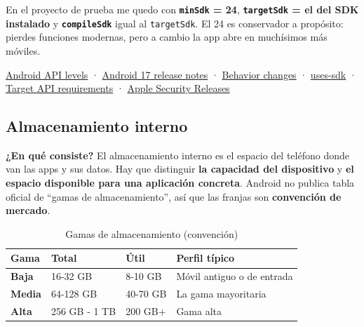 \documentclass[11pt,a4paper]{article}
\newcommand{\code}[1]{\texttt{\color{ink}#1}}
\newcommand{\campo}[1]{\textbf{\color{ink}#1}}
\begin{document}
	En el proyecto de prueba me quedo con \textbf{\code{minSdk} = 24}, \textbf{\code{targetSdk} = el del SDK instalado} y \textbf{\code{compileSdk}} igual al \code{targetSdk}. El 24 es conservador a propósito: pierdes funciones modernas, pero a cambio la app abre en muchísimos más móviles.
	
	\begin{fuentesbox}
		\href{https://developer.android.com/tools/releases/platforms}{Android API levels} ·
		\href{https://developer.android.com/about/versions/17/release-notes}{Android 17 release notes} ·
		\href{https://developer.android.com/about/versions/17/behavior-changes-all}{Behavior changes} ·
		\href{https://developer.android.com/guide/topics/manifest/uses-sdk-element}{uses-sdk} ·
		\href{https://support.google.com/googleplay/android-developer/answer/11926878}{Target API requirements} ·
		\href{https://support.apple.com/en-us/148282}{Apple Security Releases}
	\end{fuentesbox}
	
	\subsection{Almacenamiento interno}
	
	\campo{¿En qué consiste?}
	El almacenamiento interno es el espacio del teléfono donde van las apps y sus datos. Hay que distinguir \textbf{la capacidad del dispositivo} y \textbf{el espacio disponible para una aplicación concreta}. Android no publica tabla oficial de \enquote{gamas de almacenamiento}, así que las franjas son \textbf{convención de mercado}.
	
	\begin{table}[htbp]
		\centering
		\small
		\begin{tabularx}{\textwidth}{@{}l l l >{\RaggedRight\arraybackslash}X@{}}
			\toprule
			\rowcolor{primary}
			\textcolor{paper}{\sffamily\bfseries Gama} & \textcolor{paper}{\sffamily\bfseries Total} & \textcolor{paper}{\sffamily\bfseries Útil} & \textcolor{paper}{\sffamily\bfseries Perfil típico} \\
			\midrule
			\textbf{Baja} & 16-32 GB & 8-10 GB & Móvil antiguo o de entrada \\
			\rowcolor{soft}
			\textbf{Media} & 64-128 GB & 40-70 GB & La gama mayoritaria \\
			\textbf{Alta} & 256 GB - 1 TB & 200 GB+ & Gama alta \\
			\bottomrule
		\end{tabularx}
		\caption{Gamas de almacenamiento (convención)}
	\end{table}
	
\end{document}
